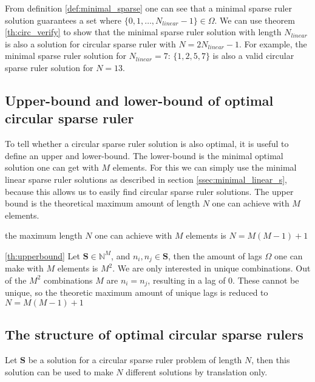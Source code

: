 \documentclass[a4paper, openany, oneside]{memoir}
\begin{document}
From definition \ref{def:minimal_sparse} one can see that a minimal sparse ruler solution guarantees a set where $\{0,1,\dots,N_{linear}-1\} \in \Omega$. We can use theorem \ref{th:circ_verify} to show that the minimal sparse ruler solution with length $N_{linear}$ is also a solution for circular sparse ruler with $N=2N_{linear}-1$. For example, the minimal sparse ruler solution for $N_{linear}=7$: $\{1,2,5,7\}$ is also a valid circular sparse ruler solution for $N=13$.

\subsection{Upper-bound and lower-bound of optimal circular sparse ruler}
To tell whether a circular sparse ruler solution is also optimal, it is useful to define an upper and lower-bound. The lower-bound is the minimal optimal solution one can get with $M$ elements. For this we can simply use the minimal linear sparse ruler solutions as described in section \ref{ssec:minimal_linear_s}, because this allows us to easily find circular sparse ruler solutions. The upper bound is the theoretical maximum amount of length $N$ one can achieve with $M$ elements.

\begin{blockTheorem} \label{th:upperbound}\nolinebreak
    the maximum length $N$ one can achieve with $M$ elements is $N=M(M-1)+1$\nolinebreak
\end{blockTheorem}

\begin{blockProofTheorem}{\ref{th:upperbound}}
    Let $\mathbf{S} \in \mathbb{N}^M$, and $n_i,n_j \in \mathbf{S}$, then the amount of lags $\Omega$ one can make with $M$ elements is $M^2$. We are only interested in unique combinations. Out of the $M^2$ combinations $M$ are $n_i=n_j$, resulting in a lag of 0. These cannot be unique, so the theoretic maximum amount of unique lags is reduced to $N=M(M-1)+1$
\end{blockProofTheorem}

\subsection{The structure of optimal circular sparse rulers}

\begin{blockTheorem} \label{th:translation}\nolinebreak
    Let $\mathbf{S}$ be a solution for a circular sparse ruler problem of length $N$, then this solution can be used to make $N$ different solutions by translation only.
\end{blockTheorem}
\end{document}
